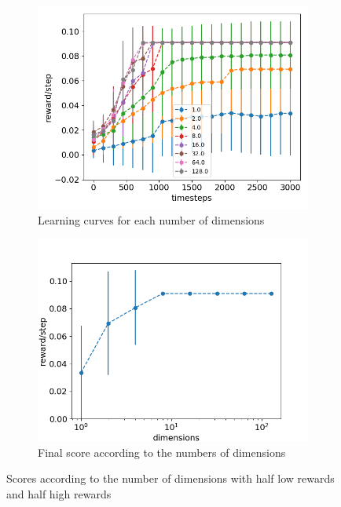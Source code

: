 \documentclass{article}
\begin{document}
\begin{figure}[H]
  \centering
  \begin{subfigure}[b]{0.45\linewidth}
    \includegraphics[width=\linewidth]{Study_3/half_reset_indept/scores_dimensions.png}
      \caption{Learning curves for each number of dimensions}
  \end{subfigure}
  \begin{subfigure}[b]{0.47\linewidth}
    \includegraphics[width=\linewidth]{Study_3/half_reset_indept/total_scores.png}
    \caption{Final score according to the numbers of dimensions}
  \end{subfigure}
  \caption{Scores according to the number of dimensions with half low rewards and half high rewards}
  \label{fig:curves_dimensions_half_reset_indept}
\end{figure}
\end{document}
